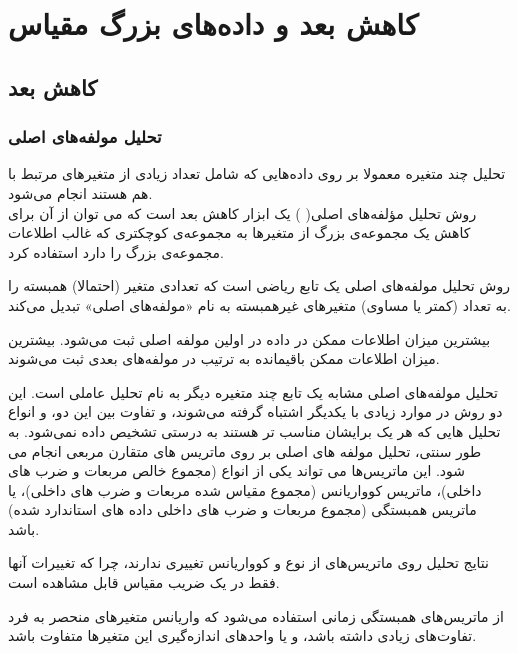 \chapter{
کاهش بعد و داده‌های بزرگ مقیاس
}


\section{
کاهش بعد
}
\subsection{
تحلیل مولفه‌های اصلی
}

تحلیل چند متغیره معمولا بر روی داده‌هایی که شامل تعداد زیادی از متغیرهای مرتبط با هم هستند انجام می‌شود.\\
روش تحلیل مؤلفه‌های اصلی(
)%
 یک ابزار کاهش بعد است که می توان از آن برای کاهش یک مجموعه‌ی بزرگ از متغیرها به مجموعه‌ی کوچکتری که غالب اطلاعات مجموعه‌ی بزرگ را دارد استفاده کرد.

روش تحلیل مولفه‌های اصلی یک تابع ریاضی است که تعدادی متغیر (احتمالا) همبسته را به تعداد (کمتر یا مساوی) متغیرهای غیرهمبسته به نام «مولفه‌های اصلی» تبدیل می‌کند.

بیشترین میزان اطلاعات ممکن در داده در اولین مولفه اصلی ثبت می‌شود. بیشترین میزان اطلاعات ممکن باقیمانده به ترتیب در مولفه‌های بعدی ثبت می‌شوند.

تحلیل مولفه‌های اصلی مشابه یک تابع چند متغیره دیگر به نام تحلیل عاملی است. این دو روش در موارد زیادی با یکدیگر اشتباه گرفته می‌شوند، و تفاوت بین این دو، و انواع تحلیل هایی که هر یک برایشان مناسب تر هستند به درستی تشخیص داده نمی‌شود.
به طور سنتی، تحلیل مولفه های اصلی بر روی ماتریس های متقارن مربعی انجام می شود. این ماتریس‌ها می تواند یکی از انواع
%
 (مجموع خالص مربعات و ضرب های داخلی)، ماتریس کوواریانس%
 (مجموع مقیاس شده مربعات و ضرب های داخلی)، یا ماتریس همبستگی%
 (مجموع مربعات و ضرب های داخلی داده های استاندارد شده) باشد.

نتایج تحلیل روی ماتریس‌های از نوع
 و کوواریانس تغییری ندارند، چرا که تغییرات آنها فقط در یک ضریب مقیاس قابل مشاهده است.

از ماتریس‌های همبستگی زمانی استفاده می‌شود که واریانس متغیرهای منحصر به فرد تفاوت‌های زیادی داشته باشد، ‌و یا واحد‌های اندازه‌گیری این متغیرها متفاوت باشد.

